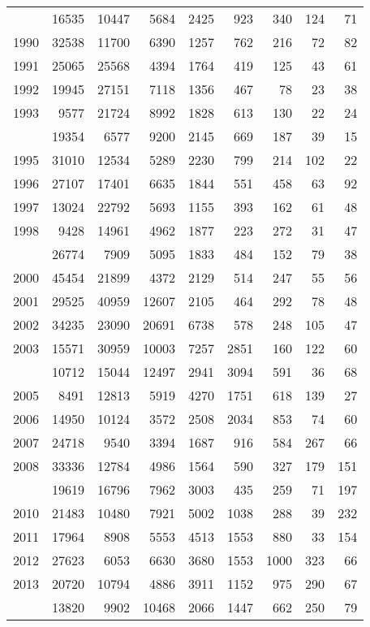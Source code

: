 \documentclass[
]{article}
\begin{document}
\begin{longtable}[t]{lrrrrrrrr}
\endfoot
\bottomrule
\endlastfoot
1989 & 16535 & 10447 & 5684 & 2425 & 923 & 340 & 124 & 71\\
1990 & 32538 & 11700 & 6390 & 1257 & 762 & 216 & 72 & 82\\
1991 & 25065 & 25568 & 4394 & 1764 & 419 & 125 & 43 & 61\\
1992 & 19945 & 27151 & 7118 & 1356 & 467 & 78 & 23 & 38\\
1993 & 9577 & 21724 & 8992 & 1828 & 613 & 130 & 22 & 24\\
\addlinespace
1994 & 19354 & 6577 & 9200 & 2145 & 669 & 187 & 39 & 15\\
1995 & 31010 & 12534 & 5289 & 2230 & 799 & 214 & 102 & 22\\
1996 & 27107 & 17401 & 6635 & 1844 & 551 & 458 & 63 & 92\\
1997 & 13024 & 22792 & 5693 & 1155 & 393 & 162 & 61 & 48\\
1998 & 9428 & 14961 & 4962 & 1877 & 223 & 272 & 31 & 47\\
\addlinespace
1999 & 26774 & 7909 & 5095 & 1833 & 484 & 152 & 79 & 38\\
2000 & 45454 & 21899 & 4372 & 2129 & 514 & 247 & 55 & 56\\
2001 & 29525 & 40959 & 12607 & 2105 & 464 & 292 & 78 & 48\\
2002 & 34235 & 23090 & 20691 & 6738 & 578 & 248 & 105 & 47\\
2003 & 15571 & 30959 & 10003 & 7257 & 2851 & 160 & 122 & 60\\
\addlinespace
2004 & 10712 & 15044 & 12497 & 2941 & 3094 & 591 & 36 & 68\\
2005 & 8491 & 12813 & 5919 & 4270 & 1751 & 618 & 139 & 27\\
2006 & 14950 & 10124 & 3572 & 2508 & 2034 & 853 & 74 & 60\\
2007 & 24718 & 9540 & 3394 & 1687 & 916 & 584 & 267 & 66\\
2008 & 33336 & 12784 & 4986 & 1564 & 590 & 327 & 179 & 151\\
\addlinespace
2009 & 19619 & 16796 & 7962 & 3003 & 435 & 259 & 71 & 197\\
2010 & 21483 & 10480 & 7921 & 5002 & 1038 & 288 & 39 & 232\\
2011 & 17964 & 8908 & 5553 & 4513 & 1553 & 880 & 33 & 154\\
2012 & 27623 & 6053 & 6630 & 3680 & 1553 & 1000 & 323 & 66\\
2013 & 20720 & 10794 & 4886 & 3911 & 1152 & 975 & 290 & 67\\
\addlinespace
2014 & 13820 & 9902 & 10468 & 2066 & 1447 & 662 & 250 & 79\\

\end{longtable}
\end{document}
